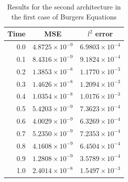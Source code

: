 \documentclass[12pt,letterpaper]{article}
\begin{document}
  \begin{table}[H]
    \begin{center}
    \begin{tabular}{ r | c  c }
    \textbf{Time} & \textbf{MSE} & \textbf{$l^2$ error} \\ \hline
    0.0 & $ 4.8725\times 10^{-9}$ & $ 6.9803\times 10^{-4} $ \\
    0.1 & $ 8.4316\times 10^{-9}$ & $ 9.1824\times 10^{-4} $ \\
    0.2 & $ 1.3853\times 10^{-8}$ & $ 1.1770\times 10^{-3} $ \\
    0.3 & $ 1.4626\times 10^{-8}$ & $ 1.2094\times 10^{-3} $ \\
    0.4 & $ 1.0354\times 10^{-8}$ & $ 1.0176\times 10^{-3} $ \\
    0.5 & $ 5.4203\times 10^{-9}$ & $ 7.3623\times 10^{-4} $ \\
    0.6 & $ 4.0029\times 10^{-9}$ & $ 6.3269\times 10^{-4} $ \\
    0.7 & $ 5.2350\times 10^{-9}$ & $ 7.2353\times 10^{-4} $ \\
    0.8 & $ 4.1608\times 10^{-9}$ & $ 6.4504\times 10^{-4} $ \\
    0.9 & $ 1.2808\times 10^{-9}$ & $ 3.5789\times 10^{-4} $ \\
    1.0 & $ 2.4014\times 10^{-8}$ & $ 1.5497\times 10^{-3} $ \\
    \end{tabular}
    \caption{Results for the second architecture in the first case of Burgers Equations}
    \label{tab:B12}
    \end{center}

    \end{table}
\end{document}
